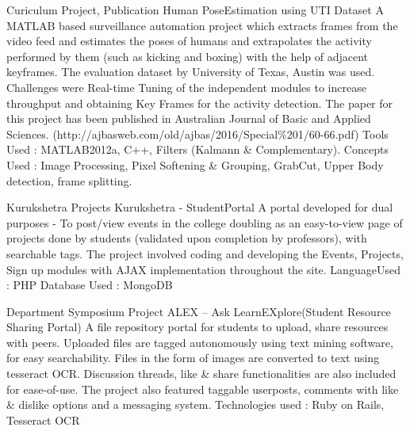 \begin{cventries}
  \cventry
    {Curiculum Project, Publication} %
    {Human​ Pose​ Estimation​ using​ UTI​ Dataset} %
    {} %
    {} %
    {
      \newline
      A MATLAB based surveillance automation project which extracts frames from the video feed and estimates the poses of humans and extrapolates the activity performed by them (such as kicking and boxing) with the help of   adjacent keyframes. The evaluation dataset by University of Texas, Austin was used. Challenges were Real-time   Tuning​ of​ the​ independent​ modules​ to​ increase​ throughput​ and​ obtaining​ Key​ Frames​ for​ the​ activity​ detection.
      The paper for this project has been published in Australian Journal of Basic and Applied Sciences.
      (http://ajbasweb.com/old/ajbas/2016/Special\%201/60-66.pdf)
      Tools​​ Used​ :  MATLAB2012a,​ C++,​ Filters​ (Kalmann​ \& Complementary).
      Concepts​ Used​ :  Image​ Processing,​ Pixel​ Softening​ \& Grouping,​ GrabCut,​ Upper​ Body​ detection,​ frame​ splitting.
    }

  \cventry
    {Kurukshetra Projects} %
    {Kurukshetra​ - Student​ Portal} %
    {} %
    {} %
    {
      \newline
      A portal developed for dual purposes - To post/view events in the college doubling as an easy-to-view page of projects done by students (validated upon completion by professors), with searchable tags. The project involved coding​ and​ developing​ the​ Events,​ Projects,​ Sign​ up​ modules​ with​ AJAX​ implementation​ throughout​ the​ site.
      Language​ Used​ :  PHP
      Database​ Used​ :  MongoDB
    }

  \cventry
    {Department Symposium Project} %
    {ALEX​ – Ask​ Learn​ EXplore(Student​ Resource​ Sharing​ Portal)} %
    {} %
    {} %
    {
      \newline
      A file repository portal for students to upload, share resources with peers. Uploaded files are tagged autonomously using text mining software, for easy searchability. Files in the form of images are converted to text using tesseract OCR. Discussion threads, like \& share functionalities are also included for ease-of-use. The project​ also​ featured​ taggable​ user​ posts,​ comments​ with​ like​ \& dislike​ options​ and​ a messaging​ system. 
      Technologies​ used​ :  Ruby​ on​ Rails,​ Tesseract​ OCR
    }
\end{cventries}
